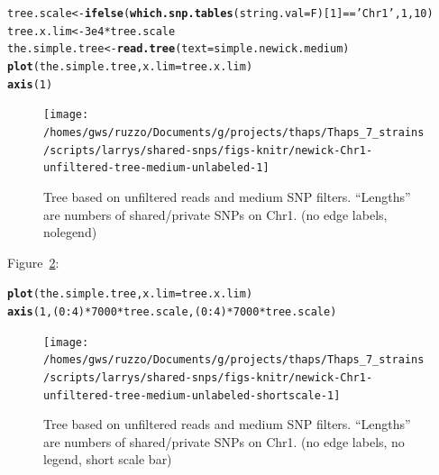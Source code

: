 \documentclass{article}\usepackage[]{graphicx}\usepackage[]{color}
\makeatletter
\newcommand{\hlnum}[1]{\textcolor[rgb]{0.686,0.059,0.569}{#1}}%
\newcommand{\hlstr}[1]{\textcolor[rgb]{0.192,0.494,0.8}{#1}}%
\newcommand{\hlopt}[1]{\textcolor[rgb]{0,0,0}{#1}}%
\newcommand{\hlstd}[1]{\textcolor[rgb]{0.345,0.345,0.345}{#1}}%
\newcommand{\hlkwb}[1]{\textcolor[rgb]{0.69,0.353,0.396}{#1}}%
\newcommand{\hlkwc}[1]{\textcolor[rgb]{0.333,0.667,0.333}{#1}}%
\newcommand{\hlkwd}[1]{\textcolor[rgb]{0.737,0.353,0.396}{\textbf{#1}}}%
\newenvironment{kframe}{%
 \def\at@end@of@kframe{}%
 \ifinner\ifhmode%
  \def\at@end@of@kframe{\end{minipage}}%
  \begin{minipage}{\columnwidth}%
 \fi\fi%
 \def\FrameCommand##1{\hskip\@totalleftmargin \hskip-\fboxsep
 \colorbox{shadecolor}{##1}\hskip-\fboxsep
     \hskip-\linewidth \hskip-\@totalleftmargin \hskip\columnwidth}%
 \MakeFramed {\advance\hsize-\width
   \@totalleftmargin\z@ \linewidth\hsize
   \@setminipage}}%
 {\par\unskip\endMakeFramed%
 \at@end@of@kframe}
\newenvironment{knitrout}{}{} %
\makeatother
\begin{document}
\begin{knitrout}\scriptsize
{}\color{fgcolor}\begin{kframe}
\begin{alltt}
\hlstd{tree.scale} \hlkwb{<-} \hlkwd{ifelse}\hlstd{(}\hlkwd{which.snp.tables}\hlstd{(}\hlkwc{string.val}\hlstd{=F)[}\hlnum{1}\hlstd{]}\hlopt{==}\hlstr{'Chr1'}\hlstd{,} \hlnum{1}\hlstd{,} \hlnum{10}\hlstd{)}
\hlstd{tree.x.lim} \hlkwb{<-} \hlnum{3e4} \hlopt{*} \hlstd{tree.scale}
\hlstd{the.simple.tree} \hlkwb{<-} \hlkwd{read.tree}\hlstd{(}\hlkwc{text}\hlstd{=simple.newick.medium)}
\hlkwd{plot}\hlstd{(the.simple.tree,} \hlkwc{x.lim} \hlstd{= tree.x.lim)}
\hlkwd{axis}\hlstd{(}\hlnum{1}\hlstd{)}
\end{alltt}
\end{kframe}\begin{figure}

{\centering \texttt{[image: /homes/gws/ruzzo/Documents/g/projects/thaps/Thaps\_7\_strains/scripts/larrys/shared-snps/figs-knitr/newick-Chr1-unfiltered-tree-medium-unlabeled-1]} 

}

\caption[Tree based on unfiltered reads and medium SNP filters]{Tree based on unfiltered reads and medium SNP filters.  ``Lengths'' are numbers of shared/private SNPs on Chr1. (no edge labels, nolegend)}\label{fig:tree-medium-unlabeled}
\end{figure}


\end{knitrout}

Figure~\ref{fig:tree-medium-unlabeled-shortscale}:

\begin{knitrout}\scriptsize
{}\color{fgcolor}\begin{kframe}
\begin{alltt}
\hlkwd{plot}\hlstd{(the.simple.tree,} \hlkwc{x.lim} \hlstd{= tree.x.lim)}
\hlkwd{axis}\hlstd{(}\hlnum{1}\hlstd{,(}\hlnum{0}\hlopt{:}\hlnum{4}\hlstd{)}\hlopt{*}\hlnum{7000}\hlopt{*}\hlstd{tree.scale,(}\hlnum{0}\hlopt{:}\hlnum{4}\hlstd{)}\hlopt{*}\hlnum{7000}\hlopt{*}\hlstd{tree.scale)}
\end{alltt}
\end{kframe}\begin{figure}

{\centering \texttt{[image: /homes/gws/ruzzo/Documents/g/projects/thaps/Thaps\_7\_strains/scripts/larrys/shared-snps/figs-knitr/newick-Chr1-unfiltered-tree-medium-unlabeled-shortscale-1]} 

}

\caption[Tree based on unfiltered reads and medium SNP filters]{Tree based on unfiltered reads and medium SNP filters.  ``Lengths'' are numbers of shared/private SNPs on Chr1. (no edge labels, no legend, short scale bar)}\label{fig:tree-medium-unlabeled-shortscale}
\end{figure}


\end{knitrout}
\end{document}
